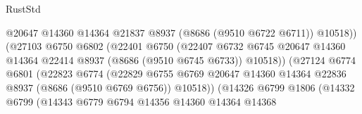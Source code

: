 \begin{lexlean}{RustStd}
\begin{coremodule}
                                            @20647
                                            @14360
                                            @14364
                                            @21837
                                            @8937
                                            (@8686 (@9510 @6722 @6711))
                                            @10518))
                                        (@27103
                                          @6750
                                          @6802
                                          (@22401
                                            @6750
                                            (@22407
                                              @6732
                                              @6745
                                              @20647
                                              @14360
                                              @14364
                                              @22414
                                              @8937
                                              (@8686 (@9510 @6745 @6733))
                                              @10518))
                                          (@27124
                                            @6774
                                            @6801
                                            (@22823
                                              @6774
                                              (@22829
                                                @6755
                                                @6769
                                                @20647
                                                @14360
                                                @14364
                                                @22836
                                                @8937
                                                (@8686 (@9510 @6769 @6756))
                                                @10518))
                                            (@14326
                                              @6799
                                              @1806
                                              (@14332
                                                @6799
                                                (@14343
                                                  @6779
                                                  @6794
                                                  @14356
                                                  @14360
                                                  @14364
                                                  @14368

\end{coremodule}
\end{lexlean}
